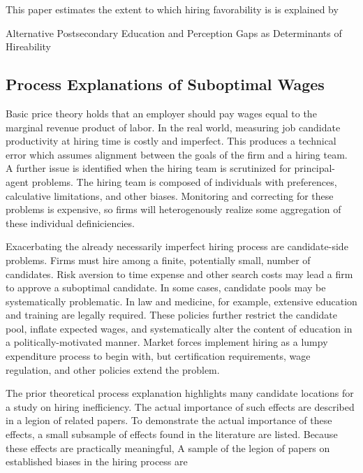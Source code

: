 \documentclass[review]{elsarticle}
\begin{document}

This paper estimates the extent to which hiring favorability is is explained by

Alternative Postsecondary Education and Perception Gaps as Determinants of Hireability

\subsection{Process Explanations of Suboptimal Wages}

Basic price theory holds that an employer should pay wages equal to the marginal revenue product of labor.
In the real world, measuring job candidate productivity at hiring time is costly and imperfect.
This produces a technical error which assumes alignment between the goals of the firm and a hiring team.
A further issue is identified when the hiring team is scrutinized for principal-agent problems.
The hiring team is composed of individuals with preferences, calculative limitations, and other biases.
Monitoring and correcting for these problems is expensive,
so firms will heterogenously realize some aggregation of these individual definiciencies.

Exacerbating the already necessarily imperfect hiring process are candidate-side problems.
Firms must hire among a finite, potentially small, number of candidates.
Risk aversion to time expense and other search costs may lead a firm to approve a suboptimal candidate.
In some cases, candidate pools may be systematically problematic.
In law and medicine, for example, extensive education and training are legally required.
These policies further restrict the candidate pool, inflate expected wages, and systematically alter the content of education in a politically-motivated manner.
Market forces implement hiring as a lumpy expenditure process to begin with, but certification requirements, wage regulation, and other policies extend the problem.

The prior theoretical process explanation highlights many candidate locations for a study on hiring inefficiency.
The actual importance of such effects are described in a legion of related papers.
To demonstrate the actual importance of these effects, a small subsample of effects found in the literature are listed.
Because these effects are practically meaningful,
A sample of the legion of papers on established biases in the hiring process are
\end{document}
